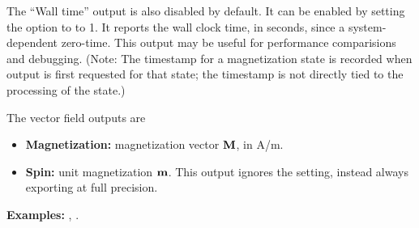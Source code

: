 \begin{description}
The ``Wall time'' output is also disabled by default.  It can be enabled
by setting the  option to to 1.  It reports
the wall clock time, in seconds, since a system-dependent zero-time.
This output may be useful for performance comparisions and
debugging. (Note: The timestamp for a magnetization state is recorded
when output is first requested for that state; the timestamp is not
directly tied to the processing of the state.)

The vector field outputs are
\begin{itemize}
\item \textbf{Magnetization:} magnetization vector $\textbf{M}$, in A/m.
\item \textbf{Spin:} unit magnetization $\textbf{m}$.  This output ignores the
  setting, instead
always exporting at full precision.
\end{itemize}

\textbf{Examples:} , .


\end{description}
